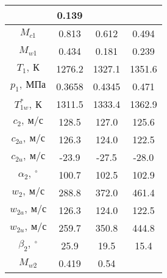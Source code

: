 \documentclass[a4paper,10pt]{article}
\begin{document}
\begin{longtable}{
    |
%    
    c|
%    
    c|
%    
    c|
%    
    c|
%    
    }
%        
        & 0.139
%        
        \\
        \hline
%        
        $M_{c1}$
%        
        & 0.813
%        
        & 0.612
%        
        & 0.494
%        
        \\
        \hline
%        
        $M_{w1}$
%        
        & 0.434
%        
        & 0.181
%        
        & 0.239
%        
        \\
        \hline
%        
        $T_1,\ К$
%        
        & 1276.2
%        
        & 1327.1
%        
        & 1351.6
%        
        \\
        \hline
%        
        $p_1,\ МПа$
%        
        & 0.3658
%        
        & 0.4345
%        
        & 0.471
%        
        \\
        \hline
%        
        $T_{1w}^*,\ К$
%        
        & 1311.5
%        
        & 1333.4
%        
        & 1362.9
%        
        \\
        \hline
%        
        $c_2,\ м/с$
%        
        & 128.5
%        
        & 127.0
%        
        & 125.6
%        
        \\
        \hline
%        
        $c_{2a},\ м/с$
%        
        & 126.3
%        
        & 124.0
%        
        & 122.5
%        
        \\
        \hline
%        
        $c_{2u},\ м/с$
%        
        & -23.9
%        
        & -27.5
%        
        & -28.0
%        
        \\
        \hline
%        
        $\alpha_2,\ ^\circ$
%        
        & 100.7
%        
        & 102.5
%        
        & 102.9
%        
        \\
        \hline
%        
        $w_2,\ м/с$
%        
        & 288.8
%        
        & 372.0
%        
        & 461.4
%        
        \\
        \hline
%        
        $w_{2a},\ м/с$
%        
        & 126.3
%        
        & 124.0
%        
        & 122.5
%        
        \\
        \hline
%        
        $w_{2u},\ м/с$
%        
        & 259.7
%        
        & 350.8
%        
        & 444.8
%        
        \\
        \hline
%        
        $\beta_2,\ ^\circ$
%        
        & 25.9
%        
        & 19.5
%        
        & 15.4
%        
        \\
        \hline
%        
        $M_{w2}$
%        
        & 0.419
%        
        & 0.54
%        

\end{longtable}
\end{document}
